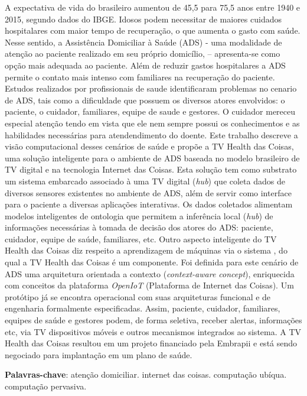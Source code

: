 \setlength{\absparsep}{18pt} %
\begin{resumo}

A expectativa de vida do brasileiro aumentou de 45,5 para 75,5 anos entre 1940
e 2015, segundo dados do IBGE. Idosos podem necessitar de maiores cuidados
hospitalares com maior tempo de recuperação, o que aumenta o gasto com saúde.
Nesse sentido, a Assistência Domiciliar à Saúde (ADS) - uma modalidade de
atenção ao paciente realizado em seu próprio domicílio, – apresenta-se como
opção mais adequada ao paciente. Além de reduzir gastos hospitalares a ADS
permite o contato mais intenso com familiares na recuperação do paciente.
Estudos realizados por profissionais de saude identificaram problemas no
cenario de ADS, tais como a dificuldade que possuem os diversos atores
envolvidos: o paciente, o cuidador, familiares, equipe de saude e gestores. O
cuidador mereceu especial atenção tendo em vista que ele nem sempre possui os
conhecimentos e as habilidades necessárias para atendendimento do doente. Este
trabalho descreve a visão computacional desses cenários de saúde e propõe a TV
Health das Coisas, uma solução inteligente para o ambiente de ADS baseada no
modelo brasileiro de TV digital e na tecnologia Internet das Coisas. Esta
solução tem como substrato um sistema embarcado associado à uma TV digital
(\textit{hub}) que coleta dados de diversos sensores existentes no ambiente de ADS, além
de servir como interface para o paciente a diversas aplicações interativas. Os
dados coletados alimentam modelos inteligentes de ontologia que permitem a
inferência local (\textit{hub}) de informações necessárias à tomada de decisão dos
atores do ADS: paciente, cuidador, equipe de saúde, familiares, etc. Outro
aspecto inteligente do TV Health das Coisas diz respeito a aprendizagem de
máquinas via o sistema \nextsaude, do qual a TV Health das Coisas é um
componente. Foi definida para este cenário de ADS uma arquitetura orientada a
contexto (\textit{context-aware concept}), enriquecida com conceitos da
plataforma \textit{OpenIoT} (Plataforma de Internet das Coisas).  Um protótipo
já se encontra operacional com suas arquiteturas funcional e de engenharia
formalmente especificadas.  Assim, paciente, cuidador, familiares, equipes de
saúde e gestores podem, de forma seletiva, receber alertas, informações etc, via
TV dispositivos móveis e outros mecanismos integrados ao sistema. A TV Health
das Coisas resultou em um projeto financiado pela Embrapii e está sendo
negociado para implantação em um plano de saúde.

 \textbf{Palavras-chave}: atenção domiciliar. internet das coisas. computação ubíqua. computação pervasiva.
 \end{resumo}
